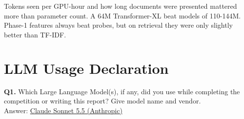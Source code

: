 \documentclass[11pt, oneside]{article}
\begin{document}
Tokens seen per GPU-hour and how long documents were presented mattered more than parameter count. A 64M Transformer-XL beat models of
110-144M. Phase-1 features always beat probes, but on retrieval they were
only slightly better than TF-IDF.



\clearpage
\section*{LLM Usage Declaration}
\noindent
\textbf{Q1.} Which Large Language Model(s), if any, did you use while completing the competition or writing this report? Give model name and vendor.\\[0.3em]
Answer: \underline{Claude Sonnet 5.5 (Anthropic)}
\medskip
\end{document}

